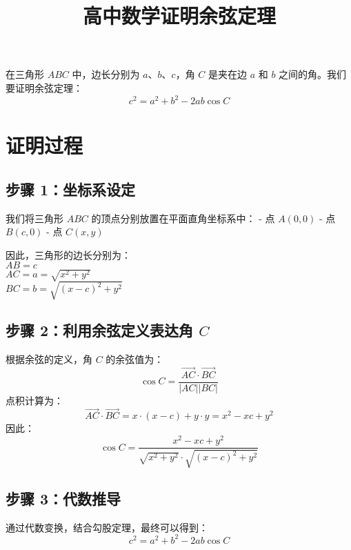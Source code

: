 \documentclass{article}
\begin{document}
\title{高中数学证明余弦定理}
\author{}
\date{}
\maketitle

在三角形 \(ABC\) 中，边长分别为 \(a\)、\(b\)、\(c\)，角 \(C\) 是夹在边 \(a\) 和 \(b\) 之间的角。我们要证明余弦定理：
\[
c^2 = a^2 + b^2 - 2ab \cos C
\]

\section*{证明过程}

\subsection*{步骤 1：坐标系设定}
我们将三角形 \(ABC\) 的顶点分别放置在平面直角坐标系中：
- 点 \(A(0, 0)\)
- 点 \(B(c, 0)\)
- 点 \(C(x, y)\)

因此，三角形的边长分别为：\\
\(AB = c\)\\
\(AC = a = \sqrt{x^2 + y^2}\)\\
\(BC = b = \sqrt{(x - c)^2 + y^2}\)\\

\subsection*{步骤 2：利用余弦定义表达角 \(C\)}
根据余弦的定义，角 \(C\) 的余弦值为：
\[
\cos C = \frac{ \overrightarrow{AC} \cdot \overrightarrow{BC} }{ |AC| |BC| }
\]
点积计算为：
\[
\overrightarrow{AC} \cdot \overrightarrow{BC} = x \cdot (x - c) + y \cdot y = x^2 - xc + y^2
\]
因此：
\[
\cos C = \frac{x^2 - xc + y^2}{ \sqrt{x^2 + y^2} \cdot \sqrt{(x - c)^2 + y^2} }
\]

\subsection*{步骤 3：代数推导}
通过代数变换，结合勾股定理，最终可以得到：
\[
c^2 = a^2 + b^2 - 2ab \cos C
\]
\end{document}
